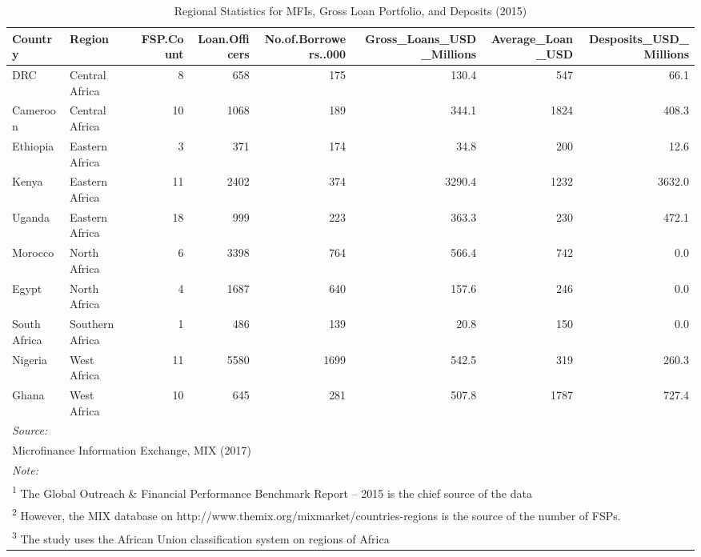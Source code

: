 \documentclass[a4paper, nobind]{templates/ociamthesis}
\begin{document}
\newpage
\begin{landscape}

\begin{table}

\caption{\label{tab:unnamed-chunk-10}Regional Statistics for MFIs, Gross Loan Portfolio, and Deposits (2015)}
\centering
\fontsize{8}{10}\selectfont
\begin{tabular}[t]{llrrrrrr}
\toprule
Country & Region & FSP.Count & Loan.Officers & No.of.Borrowers..000 & Gross\_Loans\_USD\_Millions & Average\_Loan\_USD & Desposits\_USD\_Millions\\
\midrule
DRC & Central Africa & 8 & 658 & 175 & 130.4 & 547 & 66.1\\
Cameroon & Central Africa & 10 & 1068 & 189 & 344.1 & 1824 & 408.3\\
Ethiopia & Eastern Africa & 3 & 371 & 174 & 34.8 & 200 & 12.6\\
Kenya & Eastern Africa & 11 & 2402 & 374 & 3290.4 & 1232 & 3632.0\\
Uganda & Eastern Africa & 18 & 999 & 223 & 363.3 & 230 & 472.1\\
\addlinespace
Morocco & North Africa & 6 & 3398 & 764 & 566.4 & 742 & 0.0\\
Egypt & North Africa & 4 & 1687 & 640 & 157.6 & 246 & 0.0\\
South Africa & Southern Africa & 1 & 486 & 139 & 20.8 & 150 & 0.0\\
Nigeria & West Africa & 11 & 5580 & 1699 & 542.5 & 319 & 260.3\\
Ghana & West Africa & 10 & 645 & 281 & 507.8 & 1787 & 727.4\\
\bottomrule
\multicolumn{8}{l}{\rule{0pt}{1em}\textit{Source: }}\\
\multicolumn{8}{l}{\rule{0pt}{1em}Microfinance Information Exchange, MIX (2017)}\\
\multicolumn{8}{l}{\rule{0pt}{1em}\textit{Note: }}\\
\multicolumn{8}{l}{\rule{0pt}{1em}\textsuperscript{1} The Global Outreach \& Financial Performance Benchmark Report – 2015 is the chief source of the data}\\
\multicolumn{8}{l}{\rule{0pt}{1em}\textsuperscript{2} However, the MIX database on http://www.themix.org/mixmarket/countries-regions is the source of the number of FSPs.}\\
\multicolumn{8}{l}{\rule{0pt}{1em}\textsuperscript{3} The study uses the African Union classification system on regions of Africa}\\
\end{tabular}
\end{table}

\end{landscape}
\end{document}
